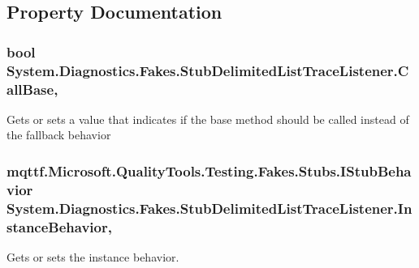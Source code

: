 \subsection{Property Documentation}
\hypertarget{class_system_1_1_diagnostics_1_1_fakes_1_1_stub_delimited_list_trace_listener_af9b1f31d6f43960c7ffba20b7561a6e4}{
\subsubsection[{Call\-Base}]{\setlength{\rightskip}{0pt plus 5cm}bool System.\-Diagnostics.\-Fakes.\-Stub\-Delimited\-List\-Trace\-Listener.\-Call\-Base\hspace{0.3cm}{\ttfamily [get]}, {\ttfamily [set]}}}\label{class_system_1_1_diagnostics_1_1_fakes_1_1_stub_delimited_list_trace_listener_af9b1f31d6f43960c7ffba20b7561a6e4}


Gets or sets a value that indicates if the base method should be called instead of the fallback behavior

\hypertarget{class_system_1_1_diagnostics_1_1_fakes_1_1_stub_delimited_list_trace_listener_af0898b12ca17a0a8a55ba2bfc62e7cb7}{
\subsubsection[{Instance\-Behavior}]{\setlength{\rightskip}{0pt plus 5cm}mqttf.\-Microsoft.\-Quality\-Tools.\-Testing.\-Fakes.\-Stubs.\-I\-Stub\-Behavior System.\-Diagnostics.\-Fakes.\-Stub\-Delimited\-List\-Trace\-Listener.\-Instance\-Behavior\hspace{0.3cm}{\ttfamily [get]}, {\ttfamily [set]}}}\label{class_system_1_1_diagnostics_1_1_fakes_1_1_stub_delimited_list_trace_listener_af0898b12ca17a0a8a55ba2bfc62e7cb7}


Gets or sets the instance behavior.

